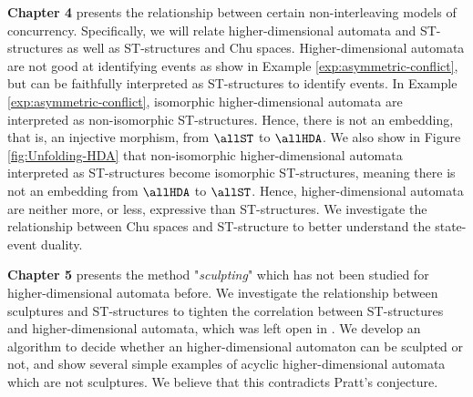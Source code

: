 
\textbf{Chapter 4} presents the relationship between certain non-interleaving models of concurrency. Specifically, we will relate higher-dimensional automata and ST-structures as well as ST-structures and Chu spaces. Higher-dimensional automata are not good at identifying events as show in Example \ref{exp:asymmetric-conflict}, but can be faithfully interpreted as ST-structures to identify events. In Example \ref{exp:asymmetric-conflict}, isomorphic higher-dimensional automata are interpreted as non-isomorphic ST-structures. Hence, there is not an embedding, that is, an injective morphism, from $\allST$ to $\allHDA$. We also show in Figure \ref{fig:Unfolding-HDA} that non-isomorphic higher-dimensional automata interpreted as ST-structures become isomorphic ST-structures, meaning there is not an embedding from $\allHDA$ to $\allST$. Hence, higher-dimensional automata are neither more, or less, expressive than ST-structures. We investigate the relationship between Chu spaces and ST-structure to better understand the state-event duality.

\textbf{Chapter 5} presents the method "\emph{sculpting}" which has not been studied for higher-dimensional automata before. We investigate the relationship between sculptures and ST-structures to tighten the correlation between ST-structures and higher-dimensional automata, which was left open in \cite{Johansen16STstruct}. We develop an algorithm to decide whether an higher-dimensional automaton can be sculpted or not, and show several simple examples of acyclic higher-dimensional automata which are not sculptures. We believe that this contradicts Pratt's conjecture.





